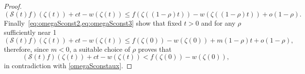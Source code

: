 \documentclass[11pt,a4paper,american]{article}
\newcommand{\Scal}{\mathcal S}
\begin{document}
\begin{proof}
        \begin{equation}\label{eq:omegaSconst3}
            (\Scal(t)f)(\zeta(t))+ct-w(\zeta(t))\le f(\zeta((1-\rho)t))-w(\zeta((1-\rho)t))+o(1-\rho).
        \end{equation}
        Finally~\cref{eq:omegaSconst2,eq:omegaSconst3} show that fixed $t>0$ and for any $\rho$ sufficiently near 1
        \begin{equation*}
            (\Scal(t)f)(\zeta(t))+ct-w(\zeta(t))\le f(\zeta(0))-w(\zeta(0))+m(1-\rho)t+o(1-\rho),
        \end{equation*}
        therefore, since $m<0$, a suitable choice of $\rho$ proves that
        \begin{equation*}
            (\Scal(t)f)(\zeta(t))+ct-w(\zeta(t))<f(\zeta(0))-w(\zeta(0)),
        \end{equation*}
        in contradiction with \cref{omegaSconstaux}.
    \end{proof}
\end{document}
